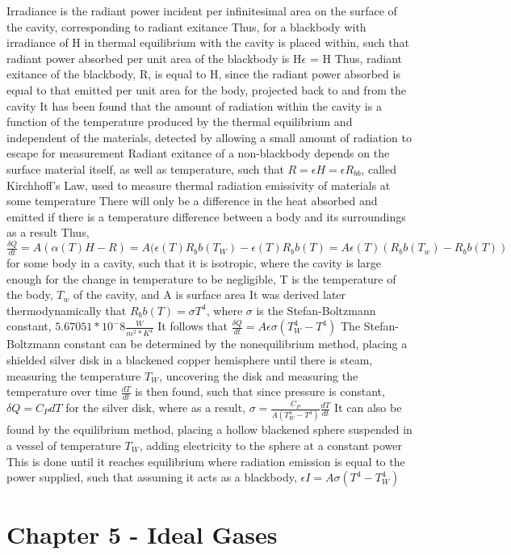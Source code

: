 \begin{outline*}
\2 Irradiance is the radiant power incident per infinitesimal area on the surface of the cavity, corresponding to radiant exitance
\3 Thus, for a blackbody with irradiance of H in thermal equilibrium with the cavity is placed within, such that radiant power absorbed per unit area of the blackbody is H$\epsilon$ = H
\3 Thus, radiant exitance of the blackbody, R, is equal to H, since the radiant power absorbed is equal to that emitted per unit area for the body, projected back to and from the cavity
\2 It has been found that the amount of radiation within the cavity is a function of the temperature produced by the thermal equilibrium and independent of the materials, detected by allowing a small amount of radiation to escape for measurement
\2 Radiant exitance of a non-blackbody depends on the surface material itself, as well as temperature, such that $R = \epsilon H = \epsilon R_{bb}$, called Kirchhoff's Law, used to measure thermal radiation emissivity of materials at some temperature
\2 There will only be a difference in the heat absorbed and emitted if there is a temperature difference between a body and its surroundings as a result
\3 Thus, $\frac{\delta Q}{dt} = A(\alpha(T) H - R) = A(\epsilon(T) R_bb(T_W) - \epsilon(T) R_bb(T) = A\epsilon(T)(R_bb(T_w) - R_bb(T))$ for some body in a cavity, such that it is isotropic, where the cavity is large enough for the change in temperature to be negligible, T is the temperature of the body, $T_w$ of the cavity, and A is surface area
\2 It was derived later thermodynamically that $R_bb(T) = \sigma T^4$, where $\sigma$ is the Stefan-Boltzmann constant, $5.67051 * 10^-8 \frac{W}{m^2 * K^4}$
\3 It follows that $\frac{\delta Q}{dt} = A\epsilon\sigma(T_W^4 - T^4)$
\3 The Stefan-Boltzmann constant can be determined by the nonequilibrium method, placing a shielded silver disk in a blackened copper hemisphere until there is steam, measuring the temperature $T_W$, uncovering the disk and measuring the temperature over time
\4 $\frac{dT}{dt}$ is then found, such that since pressure is constant, $\delta Q = C_P dT$ for the silver disk, where as a result, $\sigma = \frac{C_P}{A(T_W^4 - T^4)}\frac{dT}{dt}$
\3 It can also be found by the equilibrium method, placing a hollow blackened sphere suspended in a vessel of temperature $T_W$, adding electricity to the sphere at a constant power
\4 This is done until it reaches equilibrium where radiation emission is equal to the power supplied, such that assuming it acts as a blackbody, $\epsilon I = A\sigma(T^4 - T_W^4)$
\end{outline*}
\section{Chapter 5 - Ideal Gases}
